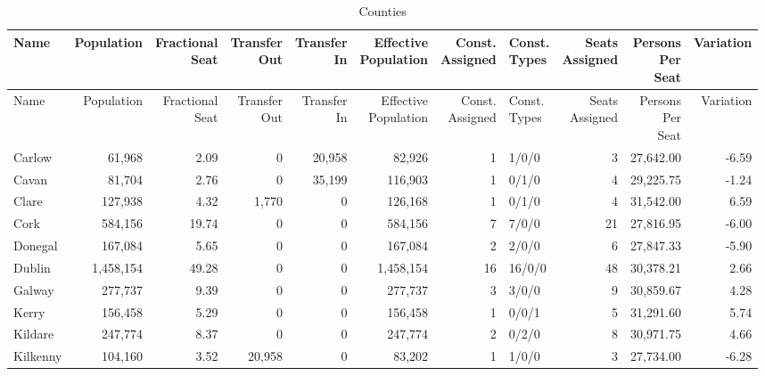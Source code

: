 \documentclass[a4paper]{article}
\begin{document}
\begin{longtable}{lrrrrrrlrrr}
\caption{Counties}
\\ \toprule
Name &Population &\shortstack{Fractional\\Seat} &\shortstack{Transfer\\Out} &\shortstack{Transfer\\In} &\shortstack{Effective\\Population} &\shortstack{Const.\\Assigned} &\shortstack{Const.\\Types} &\shortstack{Seats\\Assigned} &\shortstack{Persons\\Per\\Seat} &Variation \\ \midrule
\endfirsthead
\toprule
Name &Population &\shortstack{Fractional\\Seat} &\shortstack{Transfer\\Out} &\shortstack{Transfer\\In} &\shortstack{Effective\\Population} &\shortstack{Const.\\Assigned} &\shortstack{Const.\\Types} &\shortstack{Seats\\Assigned} &\shortstack{Persons\\Per\\Seat} &Variation \\ \midrule
\endhead
\bottomrule
\endfoot
Carlow&61,968& 2.09&0&20,958&82,926&1&1/0/0&3&27,642.00&-6.59\\ 
Cavan&81,704& 2.76&0&35,199&116,903&1&0/1/0&4&29,225.75&-1.24\\ 
Clare&127,938& 4.32&1,770&0&126,168&1&0/1/0&4&31,542.00& 6.59\\ 
Cork&584,156&19.74&0&0&584,156&7&7/0/0&21&27,816.95&-6.00\\ 
Donegal&167,084& 5.65&0&0&167,084&2&2/0/0&6&27,847.33&-5.90\\ 
Dublin&1,458,154&49.28&0&0&1,458,154&16&16/0/0&48&30,378.21& 2.66\\ 
Galway&277,737& 9.39&0&0&277,737&3&3/0/0&9&30,859.67& 4.28\\ 
Kerry&156,458& 5.29&0&0&156,458&1&0/0/1&5&31,291.60& 5.74\\ 
Kildare&247,774& 8.37&0&0&247,774&2&0/2/0&8&30,971.75& 4.66\\ 
Kilkenny&104,160& 3.52&20,958&0&83,202&1&1/0/0&3&27,734.00&-6.28\\ 

\end{longtable}
\end{document}

